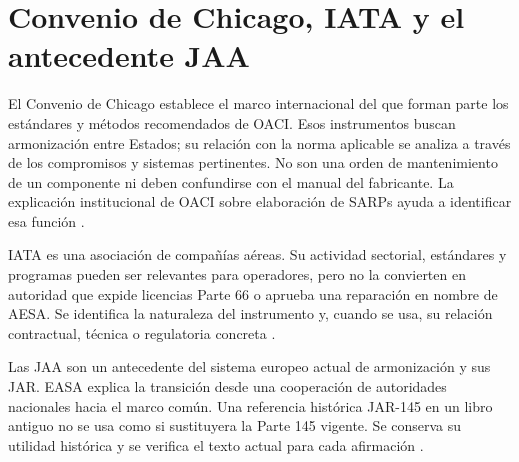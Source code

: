 \section{Convenio de Chicago, IATA y el antecedente JAA}
El Convenio de Chicago establece el marco internacional del que forman parte los estándares y métodos recomendados de OACI. Esos instrumentos buscan armonización entre Estados; su relación con la norma aplicable se analiza a través de los compromisos y sistemas pertinentes. No son una orden de mantenimiento de un componente ni deben confundirse con el manual del fabricante. La explicación institucional de OACI sobre elaboración de SARPs ayuda a identificar esa función \cite{ICAO-SARPS}.

IATA es una asociación de compañías aéreas. Su actividad sectorial, estándares y programas pueden ser relevantes para operadores, pero no la convierten en autoridad que expide licencias Parte 66 o aprueba una reparación en nombre de AESA. Se identifica la naturaleza del instrumento y, cuando se usa, su relación contractual, técnica o regulatoria concreta \cite{IATA}.

Las JAA son un antecedente del sistema europeo actual de armonización y sus JAR. EASA explica la transición desde una cooperación de autoridades nacionales hacia el marco común. Una referencia histórica JAR-145 en un libro antiguo no se usa como si sustituyera la Parte 145 vigente. Se conserva su utilidad histórica y se verifica el texto actual para cada afirmación \cite{EASA-JAA}.

